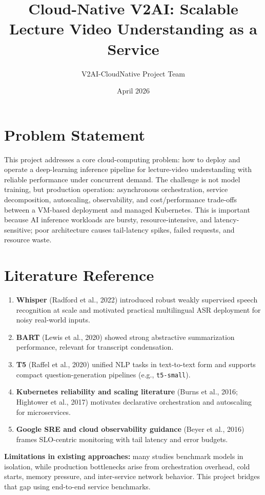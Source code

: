 \documentclass[11pt,a4paper]{article}
\title{Cloud-Native V2AI: Scalable Lecture Video Understanding as a Service}
\author{V2AI-CloudNative Project Team}
\date{April 2026}
\begin{document}
\maketitle

\section{Problem Statement}
This project addresses a core cloud-computing problem: how to deploy and operate a deep-learning inference pipeline for lecture-video understanding with reliable performance under concurrent demand. The challenge is not model training, but production operation: asynchronous orchestration, service decomposition, autoscaling, observability, and cost/performance trade-offs between a VM-based deployment and managed Kubernetes. This is important because AI inference workloads are bursty, resource-intensive, and latency-sensitive; poor architecture causes tail-latency spikes, failed requests, and resource waste.

\section{Literature Reference}
\begin{enumerate}
    \item \textbf{Whisper} (Radford et al., 2022) introduced robust weakly supervised speech recognition at scale and motivated practical multilingual ASR deployment for noisy real-world inputs.
    \item \textbf{BART} (Lewis et al., 2020) showed strong abstractive summarization performance, relevant for transcript condensation.
    \item \textbf{T5} (Raffel et al., 2020) unified NLP tasks in text-to-text form and supports compact question-generation pipelines (e.g., \texttt{t5-small}).
    \item \textbf{Kubernetes reliability and scaling literature} (Burns et al., 2016; Hightower et al., 2017) motivates declarative orchestration and autoscaling for microservices.
    \item \textbf{Google SRE and cloud observability guidance} (Beyer et al., 2016) frames SLO-centric monitoring with tail latency and error budgets.
\end{enumerate}

\textbf{Limitations in existing approaches:} many studies benchmark models in isolation, while production bottlenecks arise from orchestration overhead, cold starts, memory pressure, and inter-service network behavior. This project bridges that gap using end-to-end service benchmarks.
\end{document}
